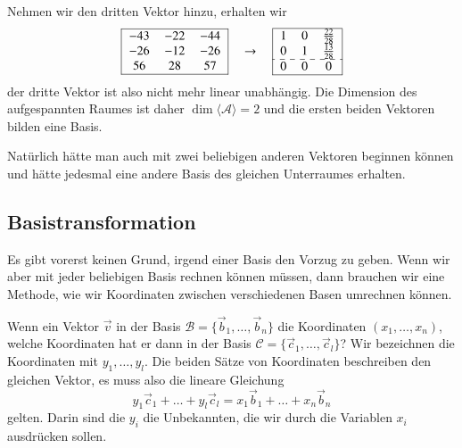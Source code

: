 \begin{beispiel}
Nehmen wir den dritten Vektor hinzu, erhalten wir
\[
\begin{tabular}{|>{$}c<{$}>{$}c<{$}>{$}c<{$}|}
\hline
  -43&  -22&  -44\\
  -26&  -12&  -26\\
   56&   28&   57\\
\hline
\end{tabular}
\quad\rightarrow\quad
\begin{tabular}{|>{$}c<{$}>{$}c<{$}>{$}c<{$}|}
\hline
1&0&\frac{22}{28}\\
0&1&\frac{13}{28}\\
\hdashline
0&0&0\\
\hline
\end{tabular}
\]
der dritte Vektor ist also nicht mehr linear unabhängig. 
Die Dimension des aufgespannten Raumes ist daher
$\dim\langle\mathcal{A}\rangle=2$ und die ersten
beiden Vektoren bilden eine Basis.

Natürlich hätte man auch mit zwei beliebigen anderen Vektoren
beginnen können und hätte jedesmal eine andere Basis des gleichen
Unterraumes erhalten.
\end{beispiel}


%
%
\subsection{Basistransformation}
Es gibt vorerst keinen Grund, irgend einer Basis den Vorzug zu geben.
Wenn wir aber mit jeder beliebigen Basis rechnen können müssen, dann
brauchen wir eine Methode, wie wir Koordinaten zwischen verschiedenen
Basen umrechnen können.

\begin{aufgabe}
\label{skript:affin:basiswechsel:aufgabe}
Wenn ein Vektor $\vec{v}$ in der Basis
$\mathcal{B}=\{\vec{b}_1,\dots,\vec{b}_n\}$
die Koordinaten $(x_1,\dots,x_n)$, welche Koordinaten hat er dann in
der Basis $\mathcal{C}=\{\vec{c}_1,\dots,\vec{c}_l\}$?
Wir bezeichnen die Koordinaten mit $y_1,\dots,y_l$.
Die beiden Sätze von Koordinaten beschreiben den gleichen Vektor,
es muss also die lineare Gleichung
\begin{equation}
y_1\vec{c}_1 + \dots + y_l\vec{c}_l
=
x_1\vec{b}_1 + \dots + x_n\vec{b}_n
\label{skript:affin:basistransformation-ansatz}
\end{equation}
gelten.
Darin sind die $y_i$ die Unbekannten, die wir durch die Variablen $x_i$
ausdrücken sollen.
\end{aufgabe}

